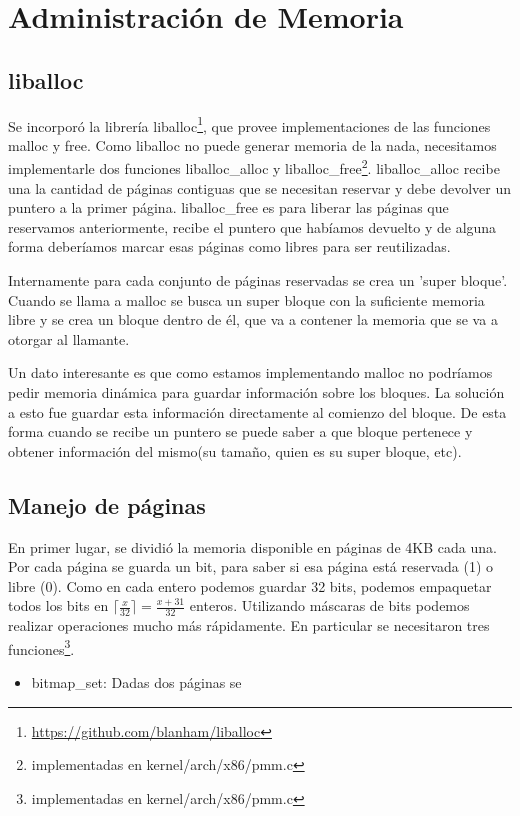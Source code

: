 \section{Administración de Memoria}\label{sec:memory}
\subsection{liballoc}
Se incorporó la librería liballoc\footnote{\url{https://github.com/blanham/liballoc}}, que provee implementaciones de las funciones malloc y free. Como liballoc no puede generar memoria de la nada, necesitamos implementarle dos funciones liballoc\_alloc y liballoc\_free\footnote{implementadas en kernel/arch/x86/pmm.c}. liballoc\_alloc recibe una la cantidad de páginas contiguas que se necesitan reservar y debe devolver un puntero a la primer página. liballoc\_free es para liberar las páginas que reservamos anteriormente, recibe el puntero que habíamos devuelto y de alguna forma deberíamos marcar esas páginas como libres para ser reutilizadas.

Internamente para cada conjunto de páginas reservadas se crea un 'super bloque'. Cuando se llama a malloc se busca un super bloque con la suficiente memoria libre y se crea un bloque dentro de él, que va a contener la memoria que se va a otorgar al llamante.

Un dato interesante es que como estamos implementando malloc no podríamos pedir memoria dinámica para guardar información sobre los bloques. La solución a esto fue guardar esta información directamente al comienzo del bloque. De esta forma cuando se recibe un puntero se puede saber a que bloque pertenece y obtener información del mismo(su tamaño, quien es su super bloque, etc).

\subsection{Manejo de páginas}
En primer lugar, se dividió la memoria disponible en páginas de 4KB cada una. Por cada página se guarda un bit, para saber si esa página está reservada (1) o libre (0). Como en cada entero podemos guardar 32 bits, podemos empaquetar todos los bits en $\lceil\frac{x}{32}\rceil=\frac{x+31}{32}$ enteros. Utilizando máscaras de bits podemos realizar operaciones mucho más rápidamente. En particular se necesitaron tres funciones\footnote{implementadas en kernel/arch/x86/pmm.c}.

\begin{itemize}
\item bitmap\_set: Dadas dos páginas se
\end{itemize}

